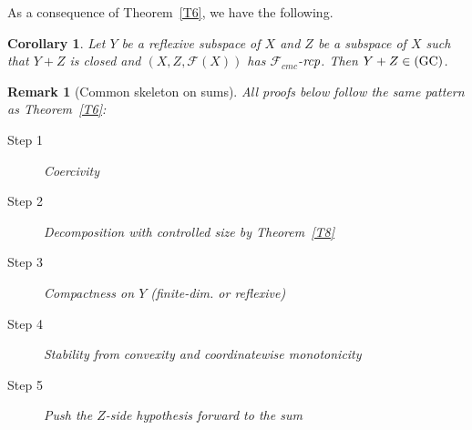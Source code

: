 \documentclass[11pt]{amsart}
\newtheorem{cor}[thm]{Corollary}
\newtheorem{rem}[thm]{Remark}
\newcommand{\mc}{\mathcal}
\newcommand{\mr}{\mathscr}
\newcommand{\ercp}{\bf{\emph{rcp}}}
\newcommand{\GC}{{\mbox{\rm (GC)}}}
\begin{document}
As a consequence of Theorem~\ref{T6}, we have the following.
\begin{cor}\label{C1}
Let $Y$ be a reflexive subspace of $X$ and $Z$ be a subspace of $X$ such that $Y+Z$ is closed and $(X,Z,\mc{F}(X))$ has $\mr{F}_{cmc}$-$\ercp$. Then $Y+Z\in\GC$.
\end{cor}


\begin{rem}[Common skeleton on sums]\label{rem:common-skeleton}
All proofs below follow the same pattern as Theorem~\ref{T6}:
\begin{description}
    \item[Step 1] Coercivity%
    \item[Step 2] Decomposition with controlled size by Theorem~\ref{T8}%
  \item[Step 3] Compactness on $Y$ (finite-dim. or reflexive)%
 \item[Step 4]
 Stability from convexity and coordinatewise monotonicity
  \item[Step 5]
Push the $Z$-side hypothesis forward to the sum%
\end{description}
\end{rem}
\end{document}
